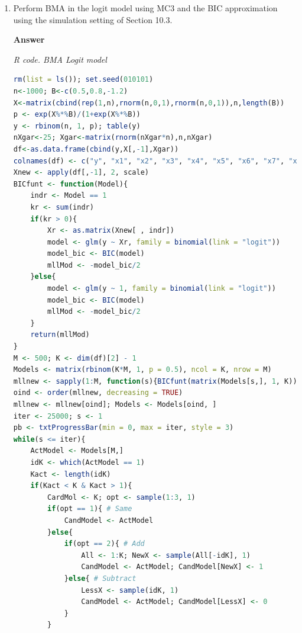 \begin{enumerate}[leftmargin=*]
We found that the best model, for which the PMP is equal to 27\%, has as regressors age, squared age, age at first birth, use birth control, husband's years of education, woman's years of education, and living in an urban area.
The first five variables have PIPs equal to 100. For instance, we found that women using birth control have approximately 15\% fewer children on average than women who are not using birth control. 

\item Perform BMA in the logit model using MC3 and the BIC approximation using the simulation setting of Section 10.3.   

\textbf{Answer}

\begin{tcolorbox}[enhanced,width=4.67in,center upper,
	fontupper=\large\bfseries,drop shadow southwest,sharp corners]
	\textit{R code. BMA Logit model}
	\begin{VF}
		\begin{lstlisting}[language=R]
rm(list = ls()); set.seed(010101)
n<-1000; B<-c(0.5,0.8,-1.2)
X<-matrix(cbind(rep(1,n),rnorm(n,0,1),rnorm(n,0,1)),n,length(B))
p <- exp(X%*%B)/(1+exp(X%*%B))
y <- rbinom(n, 1, p); table(y)
nXgar<-25; Xgar<-matrix(rnorm(nXgar*n),n,nXgar)
df<-as.data.frame(cbind(y,X[,-1],Xgar))
colnames(df) <- c("y", "x1", "x2", "x3", "x4", "x5", "x6", "x7", "x8", "x9", "x10", "x11", "x12", "x13", "x14", "x15", "x16", "x17", "x18", "x19", "x20", "x21", "x22", "x23", "x24", "x25", "x26", "x27")
Xnew <- apply(df[,-1], 2, scale)
BICfunt <- function(Model){
	indr <- Model == 1
	kr <- sum(indr)
	if(kr > 0){
		Xr <- as.matrix(Xnew[ , indr])
		model <- glm(y ~ Xr, family = binomial(link = "logit"))
		model_bic <- BIC(model)
		mllMod <- -model_bic/2
	}else{
		model <- glm(y ~ 1, family = binomial(link = "logit"))
		model_bic <- BIC(model)
		mllMod <- -model_bic/2
	}
	return(mllMod)
}
M <- 500; K <- dim(df)[2] - 1
Models <- matrix(rbinom(K*M, 1, p = 0.5), ncol = K, nrow = M)
mllnew <- sapply(1:M, function(s){BICfunt(matrix(Models[s,], 1, K))})
oind <- order(mllnew, decreasing = TRUE)
mllnew <- mllnew[oind]; Models <- Models[oind, ]
iter <- 25000; s <- 1
pb <- txtProgressBar(min = 0, max = iter, style = 3)
while(s <= iter){
	ActModel <- Models[M,]
	idK <- which(ActModel == 1)
	Kact <- length(idK)
	if(Kact < K & Kact > 1){
		CardMol <- K; opt <- sample(1:3, 1)
		if(opt == 1){ # Same
			CandModel <- ActModel
		}else{
			if(opt == 2){ # Add
				All <- 1:K; NewX <- sample(All[-idK], 1)
				CandModel <- ActModel; CandModel[NewX] <- 1
			}else{ # Subtract
				LessX <- sample(idK, 1)
				CandModel <- ActModel; CandModel[LessX] <- 0
			}
		}
\end{lstlisting}
	\end{VF}
\end{tcolorbox} 



\end{enumerate}
